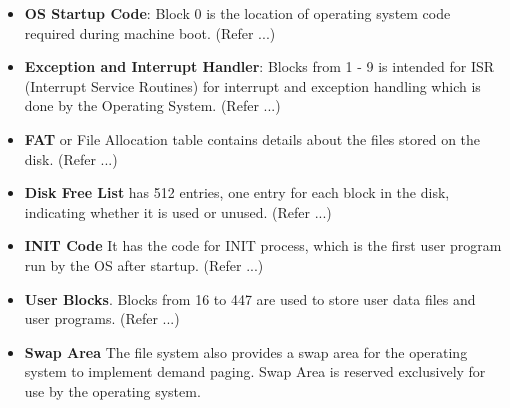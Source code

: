 \documentclass[11pt]{article}
\begin{document}
\begin{itemize}
\item \textbf{OS Startup Code}: Block 0 is the location of operating system code required during machine boot. (Refer ...)
\item \textbf{Exception and Interrupt Handler}: Blocks from 1 - 9 is intended for ISR (Interrupt Service Routines) for interrupt and exception handling which is done by the Operating System.  (Refer ...)
\item \textbf{FAT} or File Allocation table contains details about the files stored on the disk. (Refer ...)
\item \textbf{Disk Free List} has 512 entries, one entry for each block in the disk, indicating whether it is used or unused. (Refer ...)
\item \textbf{INIT Code} It has the code for INIT process, which is the first user program run by the OS after startup. (Refer ...) 
\item \textbf{User Blocks}. Blocks from 16 to 447 are used to store user data files and user programs. (Refer ...)
\item \textbf{Swap Area} The file system also provides a swap area for the operating system to implement demand paging. Swap Area is reserved exclusively for use by the operating system.

\end{itemize}
\end{document}
